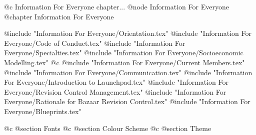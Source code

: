@c Information For Everyone chapter...
@node Information For Everyone
@chapter Information For Everyone

@include "Information For Everyone/Orientation.tex"
@include "Information For Everyone/Code of Conduct.tex"
@include "Information For Everyone/Specialties.tex"
@include "Information For Everyone/Socioeconomic Modelling.tex"
@c @include "Information For Everyone/Current Members.tex"
@include "Information For Everyone/Communication.tex"
@include "Information For Everyone/Introduction to Launchpad.tex"
@include "Information For Everyone/Revision Control Management.tex"
@include "Information For Everyone/Rationale for Bazaar Revision Control.tex"
@include "Information For Everyone/Blueprints.tex"

@c @section Fonts
@c @section Colour Scheme
@c @section Theme



